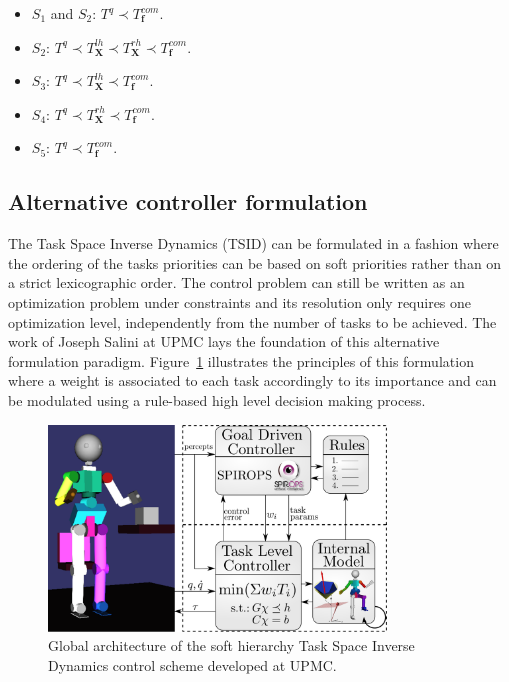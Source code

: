 \documentclass[12pt,a4paper,twoside]{article}
\begin{document}
\begin{itemize}
\item $S_1$ and $S_2$: $T^q \prec T^{com}_{\bm f}$.
\item $S_2$: $T^q \prec T^{lh}_{\bm X}  \prec  T^{rh}_{\bm X} \prec T^{com}_{\bm f} $.
\item $S_3$: $T^q \prec T^{lh}_{\bm X}  \prec T^{com}_{\bm f} $.
\item $S_4$: $T^q \prec T^{rh}_{\bm X}  \prec T^{com}_{\bm f} $.
\item $S_5$: $T^q \prec T^{com}_{\bm f} $.
\end{itemize}

\subsection{Alternative controller formulation}
The Task Space Inverse Dynamics (TSID) can be formulated in a fashion where the ordering of the tasks priorities can be based on soft priorities rather than on a strict lexicographic order. The control problem can still be written as an optimization problem under constraints and its resolution only requires one optimization level, independently from the number of tasks to be achieved. The work of Joseph Salini \cite{salini2012} at UPMC lays the foundation of this alternative formulation paradigm. Figure~\ref{fig:joseph} illustrates the principles of this formulation where a weight is associated to each task accordingly to its importance and can be modulated using a rule-based high level decision making process.\\

\begin{figure}
\begin{center}
\centering
\includegraphics[width=0.8\textwidth]{images/global_architecture.pdf} 
\caption{Global architecture of the soft hierarchy Task Space Inverse Dynamics control scheme developed at UPMC.}
\label{fig:joseph}
\end{center}
\end{figure}
\end{document}
